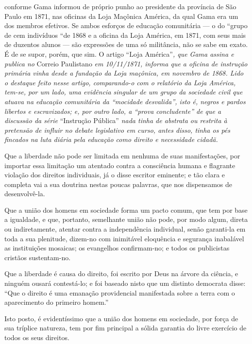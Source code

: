 \begin{didascalia}
{conforme Gama informou de próprio punho ao presidente da província de
São Paulo em 1871, nas oficinas da Loja Maçônica América, da qual Gama
era um dos membros efetivos. Se ambos esforços de educação comunitária
--- o do ``grupo de cem indivíduos ``de 1868 e a oficina da Loja América,
em 1871, com seus mais de duzentos alunos --- são expressões de uma só
militância, não se sabe em exato. É de se supor, porém, que sim. O
artigo} ``Loja América''\emph{, que Gama assina e publica no} Correio
Paulistano \emph{em 10/11/1871, informa que a oficina de instrução
primária vinha desde a fundação da Loja maçônica, em novembro de 1868.
Lido o destaque feito nesse artigo, comparando-o com o relatório da Loja
América, tem-se, por um lado, uma evidência singular de um grupo da
sociedade civil que atuava na educação comunitária da ``mocidade
desvalida'', isto é, negros e pardos libertos e escravizados; e, por
outro lado, a ``prova concludente'' de que a discussão da série}
``Instrução Pública'' \emph{nada tinha de abstrata ou restrita à pretensão
de influir no debate legislativo em curso, antes disso, tinha os pés
fincados na luta diária pela educação como direito e necessidade
cidadã.}
\end{didascalia}



Que a liberdade não pode ser limitada em nenhuma de suas manifestações,
por importar essa limitação um atentado contra a consciência humana e
flagrante violação dos direitos individuais, já o disse escritor
eminente; e tão clara e completa vai a sua doutrina nestas poucas
palavras, que nos dispensamos de desenvolvê-la.

Que a união dos homens em sociedade forma um pacto comum, que tem por
base a igualdade, e que, portanto, semelhante união não pode, por modo
algum, direta ou indiretamente, atentar contra a independência
individual, senão garanti-la em toda a sua plenitude, dizem-no com
inimitável eloquência e segurança inabalável as instituições mosaicas;
os evangelhos confirmam-no; e todos os publicistas cristãos
sustentam-no.

Que a liberdade é causa do direito, foi escrito por Deus na árvore da
ciência, e ninguém ousará contestá-lo; e foi baseado nisto que um
distinto democrata disse: ``Que o direito é uma emanação providencial
manifestada sobre a terra com o aparecimento do primeiro homem.''

Isto posto, é evidentíssimo que a união dos homens em sociedade, por
força de sua tríplice natureza, tem por fim principal a sólida garantia
do livre exercício de todos os seus direitos.

